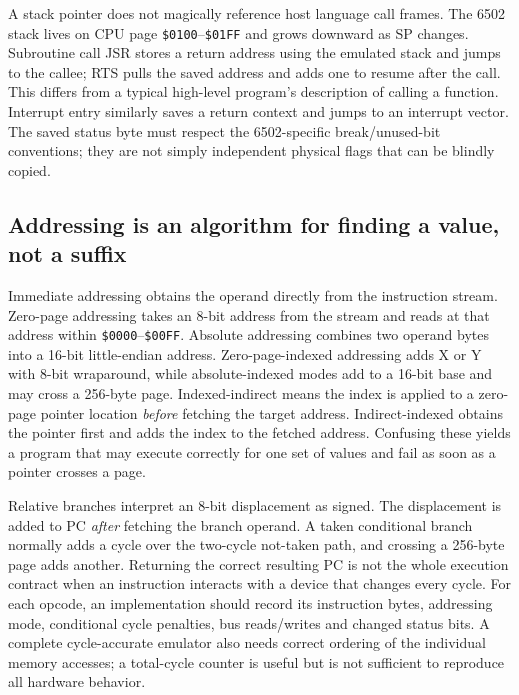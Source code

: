 A stack pointer does not magically reference host language call frames. The 6502 stack lives on CPU page \texttt{\$0100}--\texttt{\$01FF} and grows downward as SP changes. Subroutine call JSR stores a return address using the emulated stack and jumps to the callee; RTS pulls the saved address and adds one to resume after the call. This differs from a typical high-level program's description of calling a function. Interrupt entry similarly saves a return context and jumps to an interrupt vector. The saved status byte must respect the 6502-specific break/unused-bit conventions; they are not simply independent physical flags that can be blindly copied.

\subsection{Addressing is an algorithm for finding a value, not a suffix}\label{06-engine-ii-ch042-addressing-is-an-algorithm-for-finding-a-value-not-a-suffix}

Immediate addressing obtains the operand directly from the instruction stream. Zero-page addressing takes an 8-bit address from the stream and reads at that address within \texttt{\$0000}--\texttt{\$00FF}. Absolute addressing combines two operand bytes into a 16-bit little-endian address. Zero-page-indexed addressing adds X or Y with 8-bit wraparound, while absolute-indexed modes add to a 16-bit base and may cross a 256-byte page. Indexed-indirect means the index is applied to a zero-page pointer location \emph{before} fetching the target address. Indirect-indexed obtains the pointer first and adds the index to the fetched address. Confusing these yields a program that may execute correctly for one set of values and fail as soon as a pointer crosses a page.

Relative branches interpret an 8-bit displacement as signed. The displacement is added to PC \emph{after} fetching the branch operand. A taken conditional branch normally adds a cycle over the two-cycle not-taken path, and crossing a 256-byte page adds another. Returning the correct resulting PC is not the whole execution contract when an instruction interacts with a device that changes every cycle. For each opcode, an implementation should record its instruction bytes, addressing mode, conditional cycle penalties, bus reads/writes and changed status bits. A complete cycle-accurate emulator also needs correct ordering of the individual memory accesses; a total-cycle counter is useful but is not sufficient to reproduce all hardware behavior.

